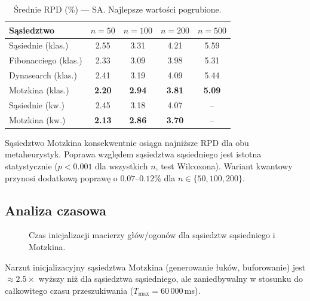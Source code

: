 \documentclass[12pt,a4paper]{article}
\begin{document}
\begin{table}[t]
\centering
\caption{Średnie RPD (\%) — SA. Najlepsze wartości pogrubione.}
\label{tab:sa}
\begin{tabular}{lcccc}
\toprule
Sąsiedztwo & $n=50$ & $n=100$ & $n=200$ & $n=500$ \\
\midrule
Sąsiednie (klas.) & 2.55 & 3.31 & 4.21 & 5.59 \\
Fibonacciego (klas.) & 2.33 & 3.09 & 3.98 & 5.31 \\
Dynasearch (klas.) & 2.41 & 3.19 & 4.09 & 5.44 \\
Motzkina (klas.) & \textbf{2.20} & \textbf{2.94} & \textbf{3.81} & \textbf{5.09} \\
\midrule
Sąsiednie (kw.) & 2.45 & 3.18 & 4.07 & -- \\
Motzkina (kw.) & \textbf{2.13} & \textbf{2.86} & \textbf{3.70} & -- \\
\bottomrule
\end{tabular}
\end{table}

Sąsiedztwo Motzkina konsekwentnie osiąga najniższe RPD dla obu metaheurystyk. Poprawa względem sąsiedztwa sąsiedniego jest istotna statystycznie ($p < 0.001$ dla wszystkich $n$, test Wilcoxona). Wariant kwantowy przynosi dodatkową poprawę o $0.07$--$0.12\%$ dla $n \in \{50, 100, 200\}$.

\subsection{Analiza czasowa}

\begin{figure}[t]
\centering
{}
\caption{Czas inicjalizacji macierzy głów/ogonów dla sąsiedztw sąsiedniego i Motzkina.}
\label{fig:init_time}
\end{figure}

Narzut inicjalizacyjny sąsiedztwa Motzkina (generowanie łuków, buforowanie) jest $\approx 2.5\times$ wyższy niż dla sąsiedztwa sąsiedniego, ale zaniedbywalny w stosunku do całkowitego czasu przeszukiwania ($T_{\max} = 60\,000$\,ms).
\end{document}
